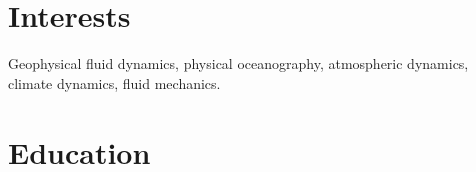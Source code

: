 \documentclass[10pt, letter]{article}
\newcommand{\pji}{\href{http://users.uoa.gr/~pjioannou/}{{\color{black}Petros J. Ioannou}}}
\begin{document}

%





%
%


\section*{\bf Interests}

\noindent Geophysical fluid dynamics, physical oceanography, atmospheric dynamics, climate dynamics, fluid mechanics.\\[.2cm]


\vspace{-2em}\section*{\bf Education}
\end{document}
